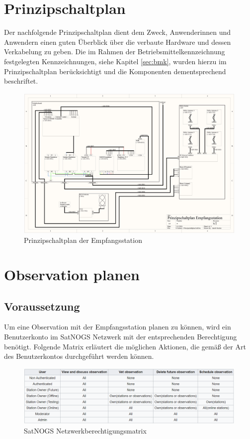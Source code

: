 \section{Prinzipschaltplan}
Der nachfolgende Prinzipschaltplan dient dem Zweck, Anwenderinnen und Anwendern einen guten Überblick über die verbaute Hardware und dessen Verkabelung zu geben. Die im Rahmen der Betriebsmittelkennzeichnung festgelegten Kennzeichnungen, siehe Kapitel \ref{sec:bmk}, wurden hierzu im Prinzipschaltplan berücksichtigt und die Komponenten dementsprechend beschriftet. 

\begin{landscape}
	\begin{figure}
		\centering
		\includegraphics[width=\linewidth]{../ref/Prinzipschaltplan.jpg}
		\caption{Prinzipschaltplan der Empfangsstation}
		\label{fig:prinzipschaltplan}
	\end{figure}
\end{landscape}

\section{Observation planen}
\subsection{Voraussetzung}
Um eine Observation mit der Empfangsstation planen zu können, wird ein Benutzerkonto im SatNOGS Netzwerk mit der entsprechenden Berechtigung benötigt. Folgende Matrix erläutert die möglichen Aktionen, die gemäß der Art des Benutzerkontos durchgeführt werden können.

\begin{figure} [H]
	\centering
	\includegraphics[width=\linewidth]{../ref/network_permission_matrix.png}
	\caption{SatNOGS Netzwerkberechtigungsmatrix \cite{noauthor_operation_nodate}}
	\label{fig:networkpermissionmatrix}
\end{figure}

